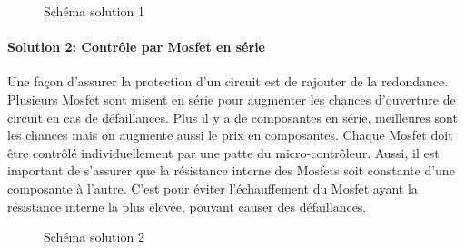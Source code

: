 		\begin{figure}[H]
			\centering
			\caption[Solution 1]{Schéma solution 1}
			\label{fig:contactorsol1}
		\end{figure}
		
		
		\paragraph*{Solution 2: Contrôle par Mosfet en série}
		Une façon d'assurer la protection d'un circuit est de rajouter de la redondance. Plusieurs Mosfet sont misent en série pour augmenter les chances d'ouverture de circuit en cas de défaillances. Plus il y a de composantes en série, meilleures sont les chances mais on augmente aussi le prix en composantes. Chaque Mosfet doit être contrôlé individuellement par une patte du micro-contrôleur. Aussi, il est important de s'assurer que la résistance interne des Mosfets soit constante d'une composante à l'autre. C'est pour éviter l'échauffement du Mosfet ayant la résistance interne la plus élevée, pouvant causer des défaillances.
		
		\begin{figure}[H]
			\centering
			\caption[Solution 2]{Schéma solution 2}
			\label{fig:contactorsol2}
		\end{figure}
		
		

